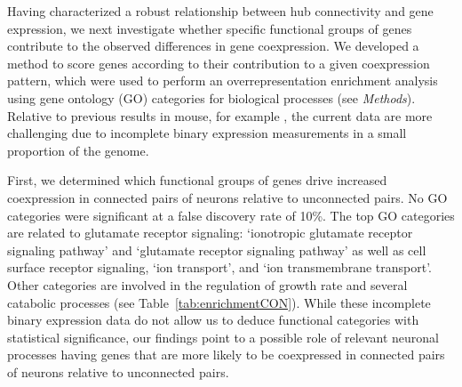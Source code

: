 \documentclass[10pt,letterpaper]{article}
\begin{document}
Having characterized a robust relationship between hub connectivity and gene expression, we next investigate whether specific functional groups of genes contribute to the observed differences in gene coexpression.
We developed a method to score genes according to their contribution to a given coexpression pattern, which were used to perform an overrepresentation enrichment analysis using gene ontology (GO) categories for biological processes \cite{Ashburner2000, Gillis2010} (see \emph{Methods}).
Relative to previous results in mouse, for example \cite{Fulcher:2016ck, Ji:2014jw, Fakhry:2015kl, French:2011cz}, the current data are more challenging due to incomplete binary expression measurements in a small proportion of the genome.

First, we determined which functional groups of genes drive increased coexpression in connected pairs of neurons relative to unconnected pairs.
No GO categories were significant at a false discovery rate of 10\%.
The top GO categories are related to glutamate receptor signaling: `ionotropic glutamate receptor signaling pathway' and `glutamate receptor signaling pathway' as well as cell surface receptor signaling, `ion transport', and `ion transmembrane transport'.
Other categories are involved in the regulation of growth rate and several catabolic processes (see Table~\ref{tab:enrichmentCON}).
While these incomplete binary expression data do not allow us to deduce functional categories with statistical significance, our findings point to a possible role of relevant neuronal processes having genes that are more likely to be coexpressed in connected pairs of neurons relative to unconnected pairs.
\end{document}
